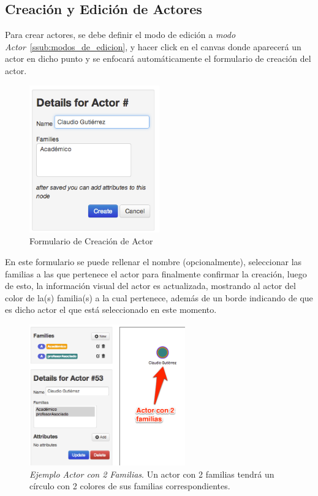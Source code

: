 
\subsection{Creación y Edición de Actores} %
\label{sub:creacion_y_edicion_de_actores}

Para crear actores, se debe definir el modo de edición a \emph{modo Actor}~\ref{ssub:modos_de_edicion}, y hacer click en el canvas donde aparecerá un actor en dicho punto y se enfocará automáticamente el formulario de creación del actor.\\

\begin{figure}[H]
  \centering
  \includegraphics[width=0.5\textwidth]{images/creacion_actor.png}
  \caption{Formulario de Creación de Actor}
  \label{creacion_actor}
\end{figure}

En este formulario se puede rellenar el nombre (opcionalmente), seleccionar las familias a las que pertenece el actor para finalmente confirmar la creación, luego de esto, la información visual del actor es actualizada, mostrando al actor del color de la(s) familia(s) a la cual pertenece, además de un borde indicando de que es dicho actor el que está seleccionado en este momento.\\

\begin{figure}[H]
  \centering
  \includegraphics[width=0.6\textwidth]{images/ejemplo_actor_2_familias.png}
  \caption[Ejemplo Actor con 2 Familias]{\emph{Ejemplo Actor con 2 Familias}. Un actor con 2 familias tendrá un círculo con 2 colores de sus familias correspondientes.}
  \label{ejemplo_actor_2_familias}
\end{figure}


